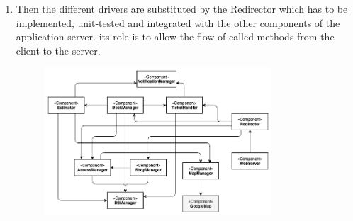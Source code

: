 \begin{enumerate}
\item Then the different drivers are substituted by the Redirector which has to be implemented, unit-tested and integrated with the other components of the application server. its role is to allow the flow of called methods from the client to the server.\\
\begin{figure}[H]
  \centering
  \includegraphics[width=0.8\textwidth,keepaspectratio]{images/IS/IS7.png}
\end{figure}
\end{enumerate}
